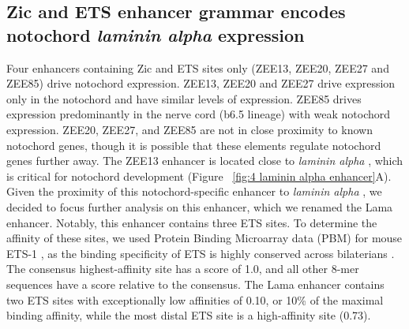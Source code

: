 \subsection{Zic and ETS enhancer grammar encodes notochord \textit{laminin alpha}  expression}

Four enhancers containing Zic and ETS sites only (ZEE13, ZEE20, ZEE27 and ZEE85)  drive notochord expression. ZEE13, ZEE20 and ZEE27 drive expression only in the notochord and have similar levels of expression. ZEE85 drives expression predominantly in the nerve cord (b6.5 lineage) with weak notochord expression. ZEE20, ZEE27, and ZEE85 are not in close proximity to known notochord genes, though it is possible that these elements regulate notochord genes further away. The ZEE13 enhancer is located close to \textit{laminin alpha} , which is critical for notochord development \cite{veeman2008} (Figure ~\ref{fig:4 laminin alpha enhancer}A). Given the proximity of this notochord-specific enhancer to \textit{laminin alpha} , we decided to focus further analysis on this enhancer, which we renamed the Lama enhancer. Notably, this enhancer contains three ETS sites. To determine the affinity of these sites, we used Protein Binding Microarray data (PBM) for mouse ETS-1 \cite{wei2010}, as the binding specificity of ETS is highly conserved across bilaterians \cite{nitta2015,wei2010}. The consensus highest-affinity site has a score of 1.0, and all other 8-mer sequences have a score relative to the consensus. The Lama enhancer contains two ETS sites with exceptionally low affinities of 0.10, or 10\% of the maximal binding affinity, while the most distal ETS site is a high-affinity site (0.73). 

